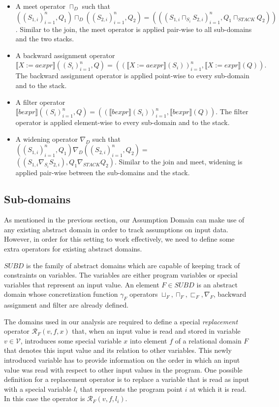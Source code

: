 \documentclass[10pt]{report}
\begin{document}
\begin{itemize}
	\item A meet operator $\sqcap_{D}$ such that $ ((S_{1,i})_{i=1}^{n}, Q_{1}) \sqcap_{D} ((S_{2,i})_{i=1}^{n}, Q_{2}) = (((S_{1,i} \sqcap_{S_{i}} S_{2,i})_{i=1}^{n}, Q_{1} \sqcap_{STACK} Q_{2}))$. Similar to the join, the meet operator is applied pair-wise to all sub-domains and the two stacks.
	\item A backward assignment operator $\llbracket X:=aexpr \rrbracket ((S_{i})_{i=1}^{n}, Q) =  ((\llbracket X:=aexpr \rrbracket(S_{i}))_{i=1}^{n}, \llbracket X:= expr \rrbracket(Q)).$ The backward assignment operator is applied point-wise to every sub-domain and to the stack. 
	\item A filter operator $ \llbracket bexpr \rrbracket ((S_{i})_{i=1}^{n}, Q) =  ((\llbracket bexpr \rrbracket(S_{i}))_{i=1}^{n}, \llbracket bexpr \rrbracket(Q)). $ The filter operator is applied element-wise to every sub-domain and to the stack.
	\item A widening operator $\nabla_{D}$ such that $ ((S_{1,i})_{i=1}^{n}, Q_{1}) \nabla_{D} ((S_{2,i})_{i=1}^{n}, Q_{2}) = $ $ ((S_{1, i} \nabla_{S_{i}} S_{2,i}), Q_{1} \nabla_{STACK} Q_{2}) .$ Similar to the join and meet, widening is applied pair-wise between the sub-domains and the stack. 
\end{itemize}

\subsection{Sub-domains} \label{sub-domains}

As mentioned in the previous section, our Assumption Domain can make use of any existing abstract domain in order to track assumptions on input data. However, in order for this setting to work effectively, we need to define some extra operators for existing abstract domains. 

$SUBD$ is the family of abstract domains which are capable of keeping track of constraints on variables. The variables are either program variables or special variables that represent an input value. An element $F \in SUBD$ is an abstract domain whose concretization function $\gamma_{F}$ operators $\sqcup_{F}, \sqcap_{F}, \sqsubset_{F}, \nabla_{F}$, backward assignment and filter are already defined.
 
The domains used in our analysis are required to define a special \textit{replacement} operator $ \mathcal{R}_{F}(v, f, x) $ that, when an input value is read and stored in variable $ v \in \mathcal{V} $, introduces some special variable $ x $ into element $ f $ of a relational domain $ F $ that denotes this input value and its relation to other variables. This newly introduced variable has to provide information on the order in which an input value was read with respect to other input values in the program. One possible definition for a replacement operator is to replace a variable that is read as input with a special variable $ l_{i} $ that represents the program point $ i $ at which it is read. In this case the operator is $ \mathcal{R}_{F}(v, f, l_{i}) $. 
\end{document}
